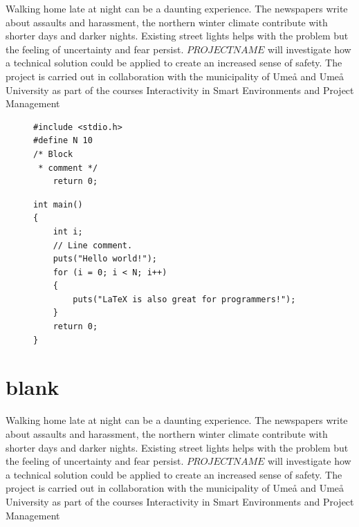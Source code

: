 \documentclass[twoside]{report}
\begin{document}
\begin{leftsiderules}
Walking home late at night can be a daunting experience. The newspapers write
about assaults and harassment, the northern winter climate contribute with
shorter days and darker nights. Existing street lights helps with the problem
but the feeling of uncertainty and fear persist. $PROJECTNAME$ will investigate
how a technical solution could be applied to create an increased sense of
safety. The project is carried out in collaboration with the municipality of
Umeå and Umeå University as part of the courses Interactivity in Smart
Environments and Project Management
\end{leftsiderules}

\newpage


\begin{figure}
  \caption*{\raggedleft {\small \textcolor{gray}{Installation, align this
  properly afterwards}}}
  \begin{minipage}[h]{\textwidth}
    \begin{lstlisting}
#include <stdio.h>
#define N 10
/* Block
 * comment */
    return 0;\end{lstlisting}
  \end{minipage}
\end{figure}

\begin{figure}
  \caption*{\raggedleft {\small \textcolor{gray}{continuation}}}
  \begin{minipage}[h]{\textwidth}
    \begin{lstlisting}
int main()
{
    int i;
    // Line comment.
    puts("Hello world!");
    for (i = 0; i < N; i++)
    {
        puts("LaTeX is also great for programmers!");
    }
    return 0;
}\end{lstlisting}
  \end{minipage}
\end{figure}

\section {blank}
Walking home late at night can be a daunting experience. The newspapers write
about assaults and harassment, the northern winter climate contribute with
shorter days and darker nights. Existing street lights helps with the problem
but the feeling of uncertainty and fear persist. $PROJECTNAME$ will investigate
how a technical solution could be applied to create an increased sense of
safety. The project is carried out in collaboration with the municipality of
Umeå and Umeå University as part of the courses Interactivity in Smart
Environments and Project Management
\newpage
\end{document}
